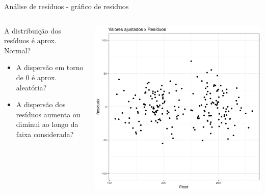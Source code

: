 \documentclass{beamer}
\begin{document}
\begin{frame}{\footnotesize Análise de resíduos - gráfico de resíduos}
  \begin{columns}
    \begin{column}{5cm}
      A distribuição dos resíduos é aprox. Normal?
      \bigskip
      \begin{itemize}
        \footnotesize
      \item A dispersão em torno de 0 é aprox. aleatória?
        \bigskip
      \item A dispersão dos resíduos aumenta ou diminui ao longo da faixa considerada?
      \end{itemize}
    \end{column}
    \begin{column}{5cm}
      \begin{center}
        \includegraphics[width=1.1\textwidth]{Cap18-19/pratica-rls-resid}
      \end{center}
    \end{column}
  \end{columns}
\end{frame}
\end{document}
